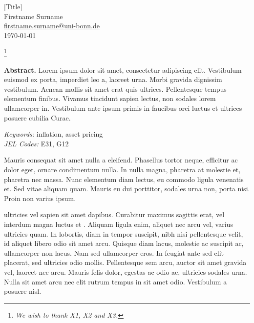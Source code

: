 \documentclass[11pt,a4paper]{article}
\newcommand\blfootnote[1]{%
  \begingroup
  \renewcommand\thefootnote{}\footnote{#1}%
  \addtocounter{footnote}{-1}%
  \endgroup
}
\begin{document}
\vspace*{0.5cm}

\thispagestyle{empty} %

\begin{center}
{\LARGE [Title]}\\[0.4cm]
 {\large Firstname Surname}\\[0.2cm]
  {\large \href{mailto:firstname.surname@uni-bonn.de}{firstname.surname@uni-bonn.de}}\\[0.2cm]
 {\large \today}\\
\end{center}

\blfootnote{\textsl{\textbullet \phantom{a} We wish to thank X1, X2 and X3.}}

\vspace*{-0.1cm}
\begin{center}
\begin{minipage}{0.9\textwidth}
\textbf{Abstract.} Lorem ipsum dolor sit amet, consectetur adipiscing elit. Vestibulum euismod ex porta, imperdiet leo a, laoreet urna. Morbi gravida dignissim vestibulum. Aenean mollis sit amet erat quis ultrices. Pellentesque tempus elementum finibus. Vivamus tincidunt sapien lectus, non sodales lorem ullamcorper in. Vestibulum ante ipsum primis in faucibus orci luctus et ultrices posuere cubilia Curae.\\[0.3cm]
\begin{footnotesize}
\textit{Keywords:} inflation, asset pricing\\
\textit{JEL Codes:} E31, G12\\
\end{footnotesize}
\end{minipage}
\end{center}


Mauris consequat sit amet nulla a eleifend. Phasellus tortor neque, efficitur ac dolor eget, ornare condimentum nulla. In nulla magna, pharetra at molestie et, pharetra nec massa. Nunc elementum diam lectus, eu commodo ligula venenatis et. Sed vitae aliquam quam. Mauris eu dui porttitor, sodales urna non, porta nisi. Proin non varius ipsum.

\cite{F1953} ultricies vel sapien sit amet dapibus. Curabitur maximus sagittis erat, vel interdum magna luctus et \citep{E2011}. Aliquam ligula enim, aliquet nec arcu vel, varius ultricies quam. In lobortis, diam in tempor suscipit, nibh nisi pellentesque velit, id aliquet libero odio sit amet arcu. Quisque diam lacus, molestie ac suscipit ac, ullamcorper non lacus. Nam sed ullamcorper eros. In feugiat ante sed elit placerat, sed ultricies odio mollis. Pellentesque sem arcu, auctor sit amet gravida vel, laoreet nec arcu. Mauris felis dolor, egestas ac odio ac, ultricies sodales urna. Nulla sit amet arcu nec elit rutrum tempus in sit amet odio. Vestibulum a posuere nisl.
\end{document}
